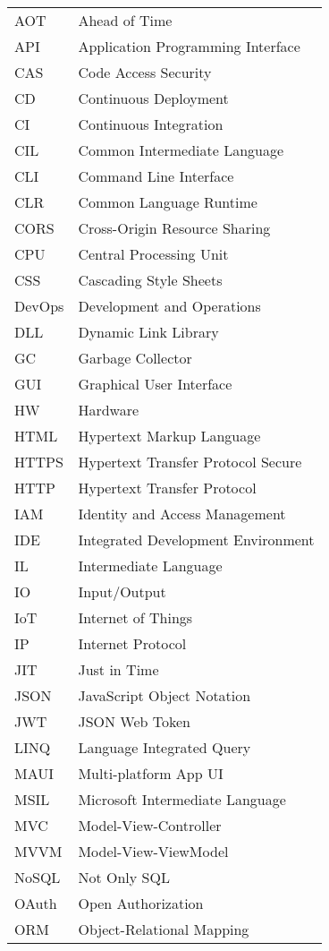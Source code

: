 
\seznamzkr

\begin{tabular}{ll}
AOT & Ahead of Time \\
API & Application Programming Interface \\
CAS & Code Access Security \\
CD & Continuous Deployment \\
CI & Continuous Integration \\
CIL & Common Intermediate Language \\
CLI & Command Line Interface \\
CLR & Common Language Runtime \\
CORS & Cross-Origin Resource Sharing \\
CPU & Central Processing Unit \\
CSS & Cascading Style Sheets \\
DevOps & Development and Operations \\
DLL & Dynamic Link Library \\
GC & Garbage Collector \\
GUI & Graphical User Interface \\
HW & Hardware \\
HTML & Hypertext Markup Language \\
HTTPS & Hypertext Transfer Protocol Secure \\
HTTP & Hypertext Transfer Protocol \\
IAM & Identity and Access Management \\
IDE & Integrated Development Environment \\
IL & Intermediate Language \\
IO & Input/Output \\
IoT & Internet of Things \\
IP & Internet Protocol \\
JIT & Just in Time \\
JSON & JavaScript Object Notation \\
JWT & JSON Web Token \\
LINQ & Language Integrated Query \\
MAUI & Multi-platform App UI \\
MSIL & Microsoft Intermediate Language \\
MVC & Model-View-Controller \\
MVVM & Model-View-ViewModel \\
NoSQL & Not Only SQL \\
OAuth & Open Authorization \\
ORM & Object-Relational Mapping \\
\end{tabular}

